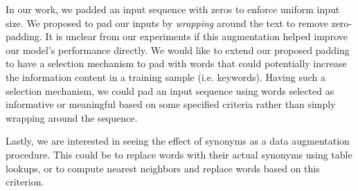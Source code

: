 In our work, we padded an input sequence with zeros to enforce uniform input size. We proposed to pad our inputs by \textit{wrapping}
around the text to remove zero-padding. It is unclear from our experiments if this augmentation helped improve our model's performance directly.
We would like to extend our proposed padding to have a selection mechanism to pad with words that could potentially increase the information content in a training
sample (i.e. keywords). Having such a selection mechanism, we could pad an input sequence using words selected as informative or meaningful based on
some specified criteria rather than simply wrapping around the sequence.

Lastly, we are interested in seeing the effect of synonyms as a data augmentation procedure. This could be to replace words with their
actual synonyms using table lookups, or to compute nearest neighbors and replace words based on this criterion.
